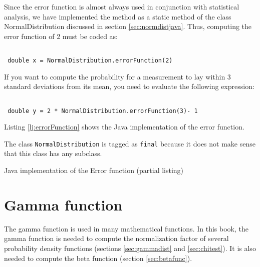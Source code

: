\documentclass[twoside]{book}
\begin{document}
Since the error function is almost always used in conjunction with
statistical analysis, we have implemented the method as a static
method of the class NormalDistribution discussed in section
\ref{sec:normdistjava}. Thus, computing the error function of 2
must be coded as:
\begin{codeExample}
\begin{verbatim}

 double x = NormalDistribution.errorFunction(2)
\end{verbatim}
\end{codeExample}
If you want to compute the probability for a measurement to lay
within 3 standard deviations from its mean, you need to evaluate
the following expression:
\begin{codeExample}
\begin{verbatim}

 double y = 2 * NormalDistribution.errorFunction(3)- 1
\end{verbatim}
\end{codeExample}
Listing \ref{lj:errorFunction} shows the Java implementation of
the error function.

The class {\tt NormalDistribution} is tagged as {\tt final}
because it does not make sense that this class has any subclass.

\begin{listing}
Java implementation of the Error function (partial
listing)
\label{lj:errorFunction}

\end{listing}

\section{Gamma function}
The gamma function is used in many mathematical functions. In this
book, the gamma function is needed to compute the normalization
factor of several probability density functions (\cf sections
\ref{sec:gammadist} and \ref{sec:chitest}). It is also needed to
compute the beta function (\cf section \ref{sec:betafunc}).
\end{document}
